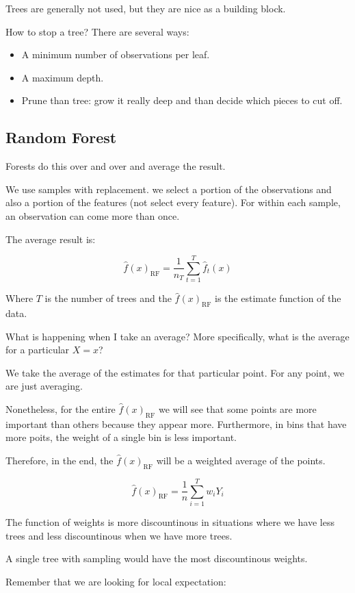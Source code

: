 \documentclass{article}
\begin{document}
Trees are generally not used, but they are nice as a building block.

How to stop a tree? There are several ways:
\begin{itemize}
    \item A minimum number of observations per leaf.
    \item A maximum depth.
    \item Prune than tree: grow it really deep and than decide which pieces to cut off.
\end{itemize}

\subsection{Random Forest}
Forests do this over and over and average the result.

We use samples with replacement. we select a portion of the observations and also a portion of the features (not select every feature). For within each sample, an observation can come more than once.

The average result is:

$$
\hat{f}(x)_{\text{RF}} = \frac{1}{n_T} \sum_{t=1}^{T} \hat{f}_t(x)
$$

Where $T$ is the number of trees and the $\hat{f}(x)_{\text{RF}}$ is the estimate function of the data.

What is happening when I take an average? More specifically, what is the average for a particular $X = x$?

We take the average of the estimates for that particular point. For any point, we are just averaging.

Nonetheless, for the entire $\hat{f}(x)_{\text{RF}}$ we will see that some points are more important than others because they appear more. Furthermore, in bins that have more poits, the weight of a single bin is less important.

Therefore, in the end, the $\hat{f}(x)_{\text{RF}}$ will be a weighted average of the points.

$$
\hat{f}(x)_{\text{RF}} = \frac{1}{n} \sum_{i = 1}^{T} w_i Y_i
$$

The function of weights is more discountinous in situations where we have less trees and less discountinous when we have more trees.

A single tree with sampling would have the most discountinous weights.

Remember that we are looking for local expectation:
\end{document}
